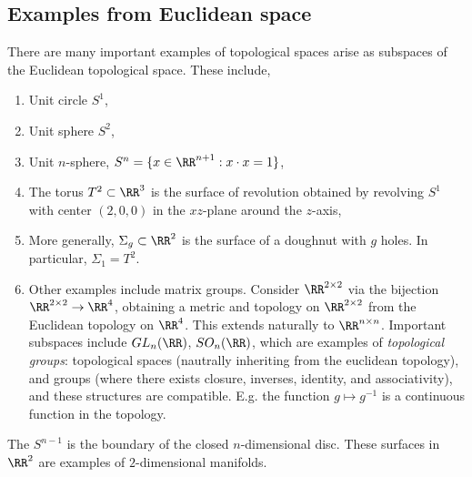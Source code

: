 \subsection{Examples from Euclidean space}
There are many important examples of topological spaces arise as subspaces of
the Euclidean topological space. These include,
\begin{enumerate}
  \item Unit circle $S^1$,
  \item Unit sphere $S^2$,
  \item Unit $n$-sphere, $S^n=\{x\in\RR^{n+1}: x\cdot x=1\}$,
  \item The torus $T^2\subset \RR^3$ is the surface of revolution obtained by
    revolving $S^1$ with center $(2,0,0)$ in the $xz$-plane around the $z$-axis,
  \item More generally, $\Sigma_g\subset\RR^2$ is the surface of a doughnut with
    $g$ holes. In particular, $\Sigma_1=T^2$.
  \item Other examples include matrix groups. Consider $\RR^{2\times 2}$ via the
    bijection $\RR^{2\times 2}\to \RR^4$, obtaining a metric and topology on
    $\RR^{2\times 2}$ from the Euclidean topology on $\RR^4$. This extends
    naturally to $\RR^{n\times n}$. Important subspaces include $GL_n(\RR)$,
    $SO_n(\RR)$, which are examples of \emph{topological groups}: topological
    spaces (nautrally inheriting from the euclidean topology), and groups
    (where there exists closure, inverses, identity, and associativity), and
    these structures are compatible. E.g. the function $g\mapsto g^{-1}$ is a
    continuous function in the topology.
\end{enumerate}
The $S^{n-1}$ is the boundary of the closed $n$-dimensional disc.
These surfaces in $\RR^2$ are examples of $2$-dimensional manifolds.

